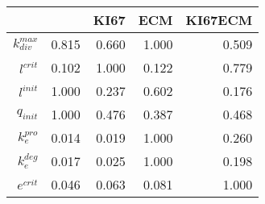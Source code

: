 \begin{tabular}{r| r r r r }
& &KI67 &ECM &KI67ECM \\
\hline 
$k_{div}^{max}$& 0.815 & 0.660 & 1.000 & 0.509 \\
$l^{crit}$& 0.102 & 1.000 & 0.122 & 0.779 \\
$l^{init}$& 1.000 & 0.237 & 0.602 & 0.176 \\
$q_{init}$& 1.000 & 0.476 & 0.387 & 0.468 \\
$k_{e}^{pro}$& 0.014 & 0.019 & 1.000 & 0.260 \\
$k_{e}^{deg}$& 0.017 & 0.025 & 1.000 & 0.198 \\
$e^{crit}$& 0.046 & 0.063 & 0.081 & 1.000 \\
\end{tabular}

